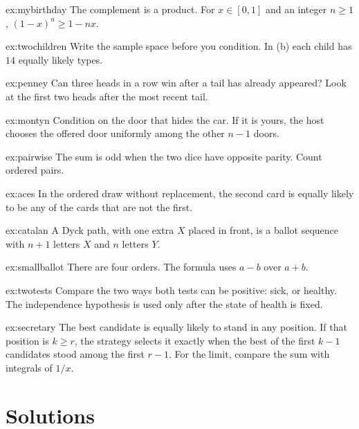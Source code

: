 \begin{hint}{ex:mybirthday}
The complement is a product. For $x\in[0,1]$ and an integer $n\ge1$, $(1-x)^n\ge1-nx$.
\end{hint}
\begin{hint}{ex:twochildren}
Write the sample space before you condition. In (b) each child has $14$ equally likely types.
\end{hint}
\begin{hint}{ex:penney}
Can three heads in a row win after a tail has already appeared? Look at the first two heads after the most recent tail.
\end{hint}
\begin{hint}{ex:montyn}
Condition on the door that hides the car. If it is yours, the host chooses the offered door uniformly among the other $n-1$ doors.
\end{hint}
\begin{hint}{ex:pairwise}
The sum is odd when the two dice have opposite parity. Count ordered pairs.
\end{hint}
\begin{hint}{ex:aces}
In the ordered draw without replacement, the second card is equally likely to be any of the cards that are not the first.
\end{hint}
\begin{hint}{ex:catalan}
A Dyck path, with one extra $X$ placed in front, is a ballot sequence with $n+1$ letters $X$ and $n$ letters $Y$.
\end{hint}
\begin{hint}{ex:smallballot}
There are four orders. The formula uses $a-b$ over $a+b$.
\end{hint}


\begin{hint}{ex:twotests}
Compare the two ways both tests can be positive: sick, or healthy. The independence hypothesis is used only after the state of health is fixed.
\end{hint}
\begin{hint}{ex:secretary}
The best candidate is equally likely to stand in any position. If that position is $k\ge r$, the strategy selects it exactly when the best of the first $k-1$ candidates stood among the first $r-1$. For the limit, compare the sum with integrals of $1/x$.
\end{hint}

\section{Solutions}

